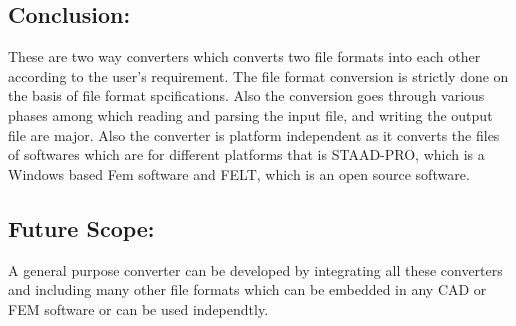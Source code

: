 \subsection{Conclusion:}
These are two way converters which converts two file formats into each other according to the user's requirement. The file format conversion is strictly done on the basis of file format spcifications. Also the conversion goes through various phases among which reading and parsing the input file, and writing the output file are major. Also the converter is platform independent as it converts the files of softwares which are for different platforms that is STAAD-PRO, which is a Windows based Fem software and FELT, which is an open source software.

\subsection{Future Scope:}
A general purpose converter can be developed by integrating all these converters and including many other file formats which can be embedded in any CAD or FEM software or can be used independtly.

